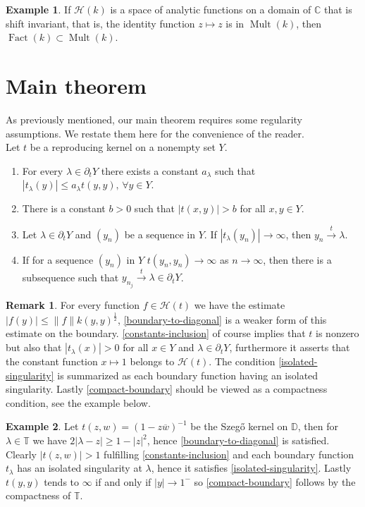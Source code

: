 \documentclass[leqno, final]{article}
\theoremstyle{definition}
\newtheorem{example}{Example}
\newtheorem{remark}{Remark}
\newcommand{\xto}[1]{\stackrel{#1}{\to}}
\newcommand{\disk}{\mathbb{D}}
\newcommand{\plane}{\mathbb{C}}
\newcommand{\torus}{\mathbb{T}}
\newcommand{\Hilbert}{\mathcal{H}}
\newcommand{\rand}{\partial}
\DeclareMathOperator{\Fact}{Fact}
\DeclareMathOperator{\Mult}{Mult}
\begin{document}
\begin{example}
If $\Hilbert(k)$ is a space of analytic functions on a domain of $\plane$ that is shift invariant,
that is, the identity function $z\mapsto z$ is in $\Mult(k)$, then $\Fact(k)\subset\Mult(k)$.
\end{example}

\section{Main theorem}
As previously mentioned, our main theorem requires some regularity assumptions. We restate
them here for the convenience of the reader.
\\ Let $t$ be a reproducing kernel on a nonempty set $Y$.
\begin{enumerate}[label=(\Alph*)]
\item
For every $\lambda\in\rand_tY$ there exists a constant $a_\lambda$ such that
$|t_\lambda(y)| \leq a_\lambda t(y,y), \,\forall y\in Y.$
\item
There is a constant $b>0$ such that $|t(x,y)|>b$ for all $x,y\in Y$.
\item
Let $\lambda\in\rand_tY$ and $(y_n)$ be a sequence in $Y$. If $|t_\lambda(y_n)|\to\infty$,
then $y_n\xto{t}\lambda$.
\item
If for a sequence $(y_n)$ in $Y$ $t(y_n,y_n)\to\infty$ as $n\to\infty$,
then there is a subsequence such that $y_{n_j}\xto{t}\lambda\in\rand_tY$.
\end{enumerate}
\begin{remark}
For every function $f\in\Hilbert(t)$ we have the estimate $|f(y)|\leq\|f\|k(y,y)^\frac12$,
\ref{boundary-to-diagonal} is a weaker form of this estimate on the boundary.
\ref{constants-inclusion} of course implies that $t$ is nonzero but also that
$|t_\lambda(x)|>0$ for all $x\in Y$ and $\lambda\in\rand_tY$, furthermore
it asserts that the constant function $x\mapsto1$ belongs to $\Hilbert(t)$.
The condition \ref{isolated-singularity} is summarized as each boundary function
having an isolated singularity.
Lastly \ref{compact-boundary} should be viewed as a compactness condition, see the
example below.
\end{remark}
\begin{example}\label{example:szego-conditions}
Let $t(z,w)=(1-z\overline w)^{-1}$ be the Szegő kernel on $\disk$, then for
$\lambda\in\torus$ we have $2|\lambda - z| \geq 1-|z|^2$, hence
\ref{boundary-to-diagonal} is satisfied.
Clearly $|t(z,w)|>1$ fulfilling \ref{constants-inclusion} and each boundary function
$t_\lambda$ has an isolated singularity at $\lambda$, hence it satisfies
\ref{isolated-singularity}.
Lastly $t(y,y)$ tends to $\infty$ if and only if $|y|\to1^-$ so
\ref{compact-boundary} follows by the compactness of $\torus$.
\end{example}
\end{document}
